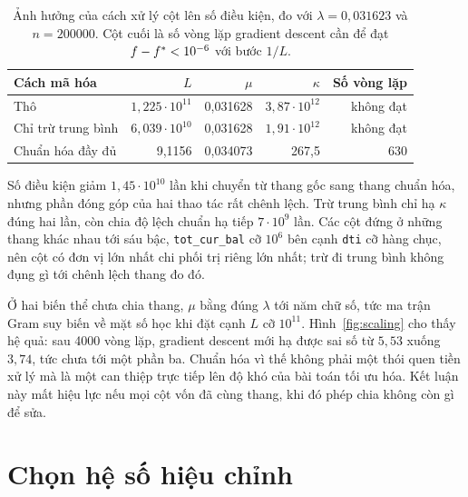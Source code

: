 \documentclass[12pt, a4paper, oneside]{report}
\theoremstyle{definition}
\begin{document}
\begin{table}[tbp]
  \centering
  \caption{Ảnh hưởng của cách xử lý cột lên số điều kiện, đo với
    $\lambda = 0{,}031623$ và $n = \num{200000}$. Cột cuối là số vòng lặp
    gradient descent cần để đạt $f - f^{*} < 10^{-6}$ với bước $1/L$.}
  \label{tab:scaling}
  \begin{tabular}{lrrrr}
    \toprule
    Cách mã hóa & $L$ & $\mu$ & $\kappa$ & Số vòng lặp \\
    \midrule
    Thô                & $1{,}225 \cdot 10^{11}$ & 0{,}031628 & $3{,}87 \cdot 10^{12}$ & không đạt \\
    Chỉ trừ trung bình & $6{,}039 \cdot 10^{10}$ & 0{,}031628 & $1{,}91 \cdot 10^{12}$ & không đạt \\
    Chuẩn hóa đầy đủ   & 9{,}1156                & 0{,}034073 & 267{,}5                & 630 \\
    \bottomrule
  \end{tabular}
\end{table}

Số điều kiện giảm $1{,}45 \cdot 10^{10}$ lần khi chuyển từ thang gốc sang thang
chuẩn hóa, nhưng phần đóng góp của hai thao tác rất chênh lệch. Trừ trung bình
chỉ hạ $\kappa$ đúng hai lần, còn chia độ lệch chuẩn hạ tiếp $7 \cdot 10^{9}$
lần. Các cột đứng ở những thang khác nhau tới sáu bậc, \texttt{tot\_cur\_bal} cỡ
$10^{6}$ bên cạnh \texttt{dti} cỡ hàng chục, nên cột có đơn vị lớn nhất chi phối
trị riêng lớn nhất; trừ đi trung bình không đụng
gì tới chênh lệch thang đo đó.

Ở hai biến thể chưa chia thang, $\mu$ bằng đúng $\lambda$ tới năm chữ số, tức ma
trận Gram suy biến về mặt số học khi đặt cạnh $L$ cỡ $10^{11}$. Hình~\ref{fig:scaling} cho thấy hệ quả: sau \num{4000} vòng lặp, gradient descent
mới hạ được sai số từ $5{,}53$ xuống $3{,}74$, tức chưa tới một phần ba. Chuẩn hóa vì thế
không phải một thói quen tiền xử lý mà là một can thiệp trực tiếp lên độ khó của
bài toán tối ưu hóa. Kết luận này mất hiệu lực nếu mọi cột vốn đã cùng thang, khi
đó phép chia không còn gì để sửa.


\section{Chọn hệ số hiệu chỉnh}
\end{document}
